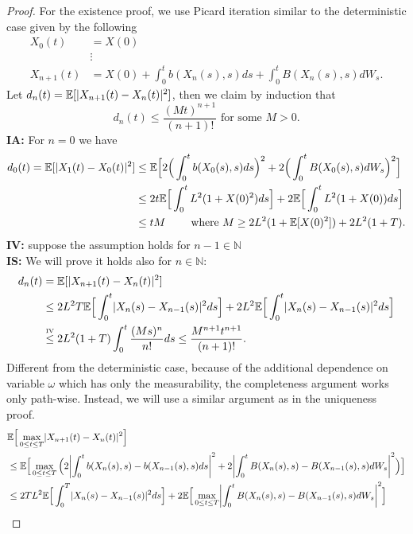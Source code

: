 \begin{proof}
 For the existence proof, we use Picard iteration similar to the deterministic case given by the following
 \begin{align*}
   X_{0}(t) &= X(0)  \\
           &\vdots\\
   X_{n+1}(t) &= X(0) + \int_0^{t} b(X_{n}(s),s ) ds + \int_0^{t} B(X_{n}(s),s ) dW_s   
 .\end{align*}
 Let $d_{n}(t) = \mathbb{E}[\lvert X_{n+1}(t)-X_{n}(t)\rvert^2] $, then we claim by induction that 
 $$
 d_{n}(t) \le  \frac{(Mt)^{n+1} }{(n+1)!} \mbox{ for some } M>0.
 $$
  \textbf{IA:} For $n=0$ we have
  \begin{align*}
    d_0(t) = \mathbb{E}[\lvert X_1(t)-X_0(t)\rvert^2] &\le  \mathbb{E}\Big[2 \Big(\int_0^{t} b(X_0(s),s) ds \Big)^2 + 2 \Big(\int_0^{t} B(X_0(s),s )dW_s \Big)^2\Big]  \\
                                       &\le  2t \mathbb{E}\Big[\int_0^{t} L^2(1+X(0)^2) ds \Big] + 2\mathbb{E}\Big[\int_0^{t} L^2(1+X(0)) ds \Big] \\
                                       &\le  tM \qquad \text{ where } M\ge 2L^2(1+\mathbb{E}[X(0)^2]) +2L^2(1+T)
  .\end{align*}
  \textbf{IV:} suppose the assumption holds for $n-1 \in  \mathbb{N}$\\
  \textbf{IS:} We will prove it holds also for $n\in\mathbb{N}$: 
  \begin{align*}
    d_{n}(t) &= \E[\abs{X_{n+1}(t) - X_{n}(t) }^2] \\
    &\le  2 L^2 T \E\Big[\int_0^{t} \abs{X_{n}(s) - X_{n-1}(s)  }^2 ds \Big]  + 2L^2\E\Big[\int_0^{t} \abs{X_{n}(s) - X_{n-1}(s)  }^2  ds\Big] \\
             &\myS{IV}{\le } 2L^2(1+T) \int_0^{t} \frac{(Ms)^n}{n!} ds \le \frac{M^{n+1}t^{n+1}}{(n+1)!} 
  .\end{align*}
  Different from the deterministic case, because of the additional dependence on variable $\omega $ which has only the measurability, the completeness argument works only path-wise. Instead, we will use a similar argument as in the uniqueness proof. 
  \begin{align*}
    &\E\Big[\max_{0\le t \le T} \abs{X_{n+1}(t) - X_{n}(t)  }^2\Big] \\
    &\le \E\Big[\max_{0\le t\le T} \Big(2\abs*{\int_0^{t} b(X_{n}(s),s )-b(X_{n-1}(s),s ) ds}^2 + 2\abs*{\int_0^{t}B(X_{n}(s),s )-B(X_{n-1}(s),s ) dW_s}^2\Big)\Big] \\
    &\le 2TL^2 \E\Big[\int_0^{T} \abs{X_{n}(s) - X_{n-1}(s)  }^2 ds \Big] + 2\E\Big[\max_{0\le t\le T} \abs*{\int_0^{t} B(X_{n}(s),s )- B(X_{n-1}(s),s ) dW_s}^2\Big]\\

\end{align*}
\end{proof}
